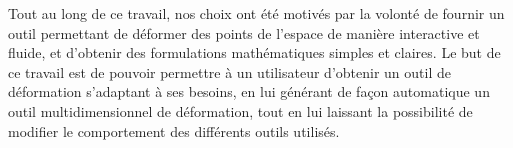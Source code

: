 Tout au long de ce travail, nos choix ont été motivés par la volonté
de fournir un outil permettant de déformer des points de l'espace de
manière interactive et fluide, et d'obtenir des formulations
mathématiques simples et claires. Le but de ce travail est de pouvoir
permettre à un utilisateur d'obtenir un outil de déformation
s'adaptant à ses besoins, en lui générant de façon automatique un
outil multidimensionnel de déformation, tout en lui laissant la
possibilité de modifier le comportement des différents outils
utilisés.


